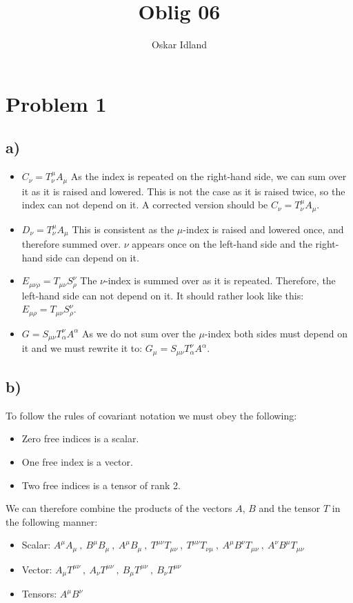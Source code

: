 \documentclass{article}
\author{Oskar Idland}
\title{Oblig 06}
\date{}
\begin{document}
\maketitle
\newpage
\section*{Problem 1}
\subsection*{a)}
\begin{itemize}
    \item $\displaystyle C_{ν} = T^{μ}_{ν}A_{μ}$ \newline
    As the index is repeated on the right-hand side, we can sum over it as it is raised and lowered. This is not the case as it is raised twice, so the index can not depend on it. A corrected version should be $\displaystyle C_{ν} = T^{μ}_{ν}A_{μ}$. 
    \item $\displaystyle D_{ν} = T^{μ}_{ν} A_{μ}$ \newline
    This is consistent as the $μ$-index is raised and lowered once, and therefore summed over. $ν$ appears once on the left-hand side and the right-hand side can depend on it.
    \item $\displaystyle E_{μνρ} = T_{μν} S^{ν}_{ρ}$ \newline
    The $ν$-index is summed over as it is repeated. Therefore, the left-hand side can not depend on it. It should rather look like this: $\displaystyle E_{μρ} = T_{μν} S^{ν}_{ρ}$. 
    \item $\displaystyle G = S_{μν} T^{ν}_{α}A^{α}$ \newline
    As we do not sum over the $μ$-index both sides must depend on it and we must rewrite it to: $\displaystyle G_{μ} = S_{μν} T^{ν}_{α}A^{α}$.
\end{itemize}

\subsection*{b)}
To follow the rules of covariant notation we must obey the following:
\begin{itemize}
    \item Zero free indices is a scalar. 
    \item One free index is a vector.
    \item Two free indices is a tensor of rank 2.
\end{itemize}
We can therefore combine the products of the vectors $A$, $B$ and the tensor $T$ in the following manner:
\begin{itemize}
    \item Scalar: $\displaystyle A^{μ}A_{μ} \ , \ B^{μ}B_{μ} \ , \ A^{μ}B_{μ} \ , \ T^{μν}T_{μν} \ , \ T^{μν}T_{νμ} \ , \ A^{μ}B^{ν}T_{μν} \ , \ A^{ν}B^{μ}T_{μν}$ 
    \item Vector: $\displaystyle A_{μ}T^{μν} \ , \ A_{ν}T^{μν} \ , \ B_{μ}T^{μν} \ , \ B_{ν}T^{μν}$
    \item Tensors: $\displaystyle A^{μ}B^{ν}$
\end{itemize}
\end{document}
